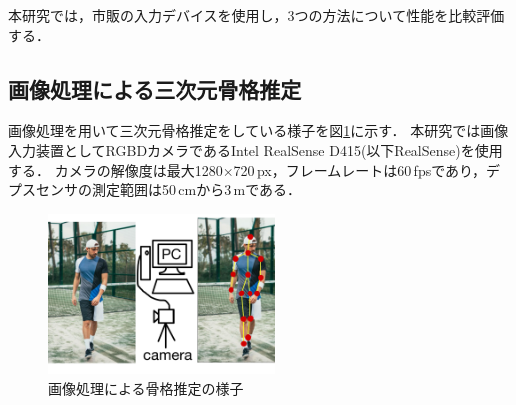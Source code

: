 \documentclass[titlepage]{jarticle}
\begin{document}
本研究では，市販の入力デバイスを使用し，3つの方法について性能を比較評価する．%
\subsection{画像処理による三次元骨格推定}\label{3Dskeleton}
画像処理を用いて三次元骨格推定をしている様子を図\ref{image_3D}に示す．
本研究では画像入力装置としてRGBDカメラであるIntel RealSense D415(以下RealSense)を使用する．
カメラの解像度は最大1280$\times$720\,px，フレームレートは60\,fpsであり，デプスセンサの測定範囲は50\,cmから3\,mである．
\begin{figure}[b]
  \centering
  \includegraphics[width=6cm]{img/image_3D.jpg}
  \caption{画像処理による骨格推定の様子}
  \label{image_3D}
\end{figure}
\end{document}
